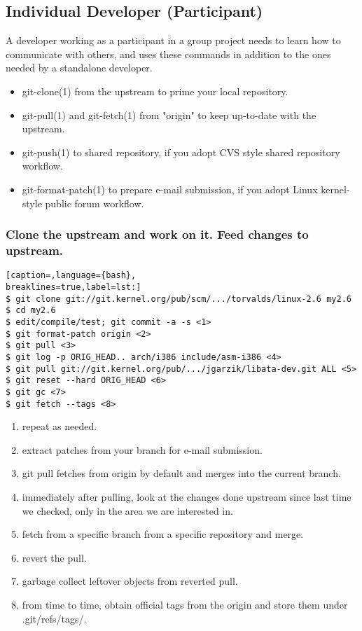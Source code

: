\subsection{Individual Developer (Participant)}
A developer working as a participant in a group project needs to learn how to
communicate with others, and uses these commands in addition to the ones needed
by a standalone developer.

\begin{itemize}
\setlength{\itemsep}{0cm}
\setlength{\parskip}{0cm}
\item git-clone(1) from the upstream to prime your local repository.
\item git-pull(1) and git-fetch(1) from "origin" to keep up-to-date with the
upstream.
\item git-push(1) to shared repository, if you adopt CVS style shared
repository workflow.
\item git-format-patch(1) to prepare e-mail submission, if you adopt Linux
kernel-style public forum workflow.
\end{itemize}

\subsubsection{Clone the upstream and work on it. Feed changes to upstream.}
\lstset{basicstyle=\scriptsize, numbers=none, captionpos=b, tabsize=4}
\begin{lstlisting}[caption=,language={bash},
breaklines=true,label=lst:]
$ git clone git://git.kernel.org/pub/scm/.../torvalds/linux-2.6 my2.6
$ cd my2.6
$ edit/compile/test; git commit -a -s <1>
$ git format-patch origin <2>
$ git pull <3>
$ git log -p ORIG_HEAD.. arch/i386 include/asm-i386 <4>
$ git pull git://git.kernel.org/pub/.../jgarzik/libata-dev.git ALL <5>
$ git reset --hard ORIG_HEAD <6>
$ git gc <7>
$ git fetch --tags <8>
\end{lstlisting}

\begin{enumerate}
\setlength{\itemsep}{0cm}
\setlength{\parskip}{0cm}
\item repeat as needed.
\item extract patches from your branch for e-mail submission.
\item git pull fetches from origin by default and merges into the current
branch.
\item immediately after pulling, look at the changes done upstream since last
time we checked, only in the area we are interested in.
\item fetch from a specific branch from a specific repository and merge.
\item revert the pull.
\item garbage collect leftover objects from reverted pull.
\item from time to time, obtain official tags from the origin and store them under .git/refs/tags/.
\end{enumerate}


